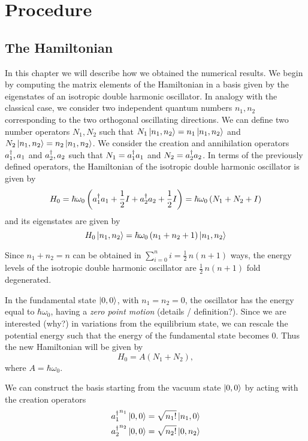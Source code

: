 \documentclass[../thesis.tex]{subfiles}
\begin{document}
\chapter{Procedure}


\section{The Hamiltonian}

In this chapter we will describe how we obtained the numerical results.
We begin by computing the matrix elements of the Hamiltonian in a basis
given by the eigenstates of an isotropic double harmonic oscillator.
In analogy with the classical case, we consider two independent
quantum numbers \(n_1, n_2\) corresponding to the two orthogonal
oscillating directions. We can define two number operators \(N_1, N_2\) such that
\(N_1 \ket{n_1, n_2} = n_1 \ket{n_1, n_2}\) and \(N_2 \ket{n_1, n_2} = n_2 \ket{n_1, n_2}\).
We consider the creation and annihilation operators \(a_{1}^{\dagger}, a_1\) and
\(a_{2}^{\dagger}, a_2\)
such that \(  N_1 = a_{1}^{\dagger} a_1 \) and \( N_2 = a_{2}^{\dagger} a_2 \).
In terms of the previously defined operators, the Hamiltonian of the isotropic
double harmonic oscillator is given by
\[
  H_0 = \hbar \omega_0 \left(a_{1}^{\dagger} a_1 + \frac{1}{2} I + a_{2}^{\dagger} a_2 + \frac{1}{2} I\right)
      = \hbar \omega_0 \left(N_1 + N_2 + I\right)
\]
and its eigenstates are given by
\[
  H_0 \ket{n_1, n_2} = \hbar \omega_0 \left( n_1 + n_2 + 1 \right) \ket{n_1, n_2}
\]

Since \(n_1 + n_2 = n\) can be obtained in \(\sum_{i=0}^n i = \frac{1}{2}\,n(n+1)\) ways,
the energy levels of the isotropic double harmonic oscillator are \(\frac{1}{2}\,n(n+1)\) fold
degenerated.

In the fundamental state \(\ket{0, 0}\), with \(n_1=n_2=0\), the oscillator has the
energy equal to \(\hbar \omega_0\),
having a \emph{zero point motion} {\color{red} (details / definition?)}.
Since we are interested {\color{red} (why?)} in variations from the equilibrium state,
we can rescale the potential energy such that the energy of the fundamental state becomes \(0\).
Thus the new Hamiltonian will be given by
\[
  H_0 = A \left(N_1 + N_2\right),
\]
where \(A = \hbar \omega_0\).

We can construct the basis starting from the vacuum state \(\ket{0, 0}\) by acting
with the creation operators
\begin{align*}
  {a_{1}^{\dagger}}^{n_1} \ket{0, 0} &= \sqrt{n_1!} \ket{n_1, 0} \\
  {a_{2}^{\dagger}}^{n_2} \ket{0, 0} &= \sqrt{n_2!} \ket{0, n_2}
\end{align*}
\end{document}
